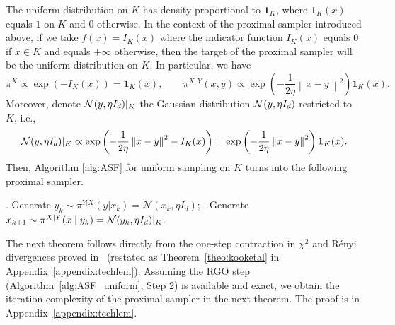 \documentclass[11pt,letterpaper]{article}
\newcommand{\norm}[1]{\left\lVert #1 \right\rVert}
\newcommand{\brac}[1]{\left( #1\right)}
\begin{document}
The uniform distribution on $K$ has density proportional to $\mathbf{1}_K$, where $ \mathbf{1}_K(x)$ equals $1$ on $K$ and $0$ otherwise. In the context of the proximal sampler introduced above, if we take $f(x)=  I_K(x)$ where the indicator function $I_K(x)$ equals $0$ if $x\in K$ and equals $+\infty$ otherwise, then the target of the proximal sampler will be the uniform distribution on $K$. In particular, we have 
       \begin{equation}\label{eq:piXY}
           \pi^X\propto \exp(-I_K(x))=\mathbf{1}_K(x), \qquad \pi^{X,Y}(x,y)\propto \exp\brac{-\frac{1}{2\eta} \norm{x-y}^2}\mathbf{1}_K(x). 
       \end{equation}
 Moreover, denote ${\cal N}(y,\eta I_d)|_K $ the Gaussian distribution ${\cal N}(y,\eta I_d)$ restricted to $K$, i.e.,
\begin{equation}\label{eq:truncated}
  {\cal N}(y,\eta I_d)|_K \propto \exp\brac{-\frac{1}{2\eta}\norm{x-y}^2-I_K(x)}=  \exp\brac{-\frac{1}{2\eta}\norm{x-y}^2}\mathbf{1}_K(x). 
\end{equation}
Then, Algorithm \ref{alg:ASF} for uniform sampling on $K$ turns into the following proximal sampler.
\begin{algorithm}[H]
	\caption{Proximal sampler for the uniform distribution on $K$}
	\label{alg:ASF_uniform}
	\begin{algorithmic}
		. Generate $y_k\sim \pi^{Y|X}(y|x_k)= \mathcal{N}\brac{x_k,\eta I_d}$;
		. Generate $x_{k+1}\sim \pi^{X \mid Y}(x \mid y_k)={\cal N}(y_k,\eta I_d)|_K. $
	\end{algorithmic}
\end{algorithm}







The next theorem follows directly from the one-step contraction in $\chi^2$ and R\'enyi divergences proved in~\cite[Theorem 23]{kook2025algodiffusion} (restated as Theorem~\ref{theo:kooketal} in Appendix~\ref{appendix:techlem}). Assuming the RGO step (Algorithm~\ref{alg:ASF_uniform}, Step 2) is available and exact, we obtain the iteration complexity of the proximal sampler in the next theorem. The proof is in Appendix~\ref{appendix:techlem}. 

\end{document}

